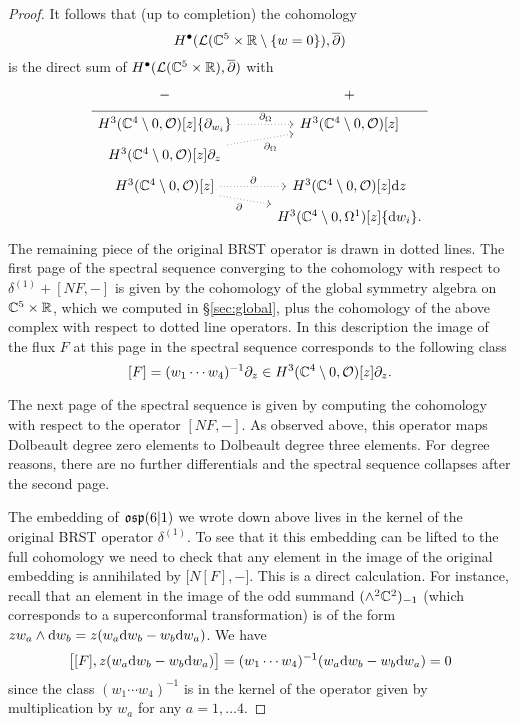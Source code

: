 \begin{proof}
It follows that (up to completion) the cohomology 
\[
H^\bullet(\mathcal L(\mathbb C^5 \times \mathbb R \setminus \{w=0\}) , \overline{\partial})
\]
is the direct sum of $H^\bullet(\mathcal L(\mathbb C^5 \times \mathbb R), \overline{\partial})$ with 
\begin{equation}
  \label{eqn:ads4ss2} 
  \begin{tikzcd}[row sep = 1 ex]
    - & + \\ \hline
H^3(\CC^4\setminus 0, \cO)[z] \{\partial_{w_i}\}  \ar[r, dotted, "\div"] & H^3(\CC^4 \setminus 0, \cO) [z] \\
H^3(\CC^4\setminus 0, \cO) [z] \partial_z \ar[ur, dotted, "\div"'] \\
H^3(\CC^4\setminus 0, \cO) [z] \ar[r, dotted, "\del"] \ar[dr, dotted, "\del"'] & H^3(\CC^4\setminus 0, \cO)[z] \d z \\ & H^3(\CC^4\setminus 0, \Omega^1)[z] \{\d w_i\} .
\end{tikzcd}
\end{equation}
The remaining piece of the original BRST operator is drawn in dotted lines. 
The first page of the spectral sequence converging to the cohomology with respect to $\delta^{(1)} + [N F, -]$ is given by the cohomology of the global symmetry algebra on $\mathbb C^5 \times \mathbb R$, which we computed in \S \ref{sec:global}, plus the cohomology of the above complex with respect to dotted line operators. 
In this description the image of the flux $F$ at this page in the spectral sequence corresponds to the following class 
\[
[F] = (w_1 \cdots w_4)^{-1} \partial_z \in H^3(\mathbb C^4\setminus 0, \mathcal O) [z] \partial_z .
\]

The next page of the spectral sequence is given by computing the cohomology with respect to the operator $[N F,-]$. 
As observed above, this operator maps Dolbeault degree zero elements to Dolbeault degree three elements. 
For degree reasons, there are no further differentials and the spectral sequence collapses after the second page. 

The embedding of $\mathfrak{osp}(6|1)$ we wrote down above lives in the kernel of the original BRST operator $\delta^{(1)}$. 
To see that it this embedding can be lifted to the full cohomology we need to check that any element in the image of the original embedding is annihilated by $\big[ N [F] , - \big]$. 
This is a direct calculation. 
For instance, recall that an element in the image of the odd summand $(\wedge^2 \mathbb C^2)_{-1}$ (which corresponds to a superconformal transformation) is of the form $z w_a \wedge {\rm d} w_b = z(w_a {\rm d} w_b - w_b {\rm d} w_a)$. 
We have
\[
\big[[F] , z(w_a {\rm d} w_b - w_b {\rm d} w_a) \big] = (w_1\cdots w_4)^{-1} (w_a {\rm d} w_b - w_b {\rm d} w_a) = 0
\]
since the class $(w_1\cdots w_4)^{-1}$ is in the kernel of the operator given by multiplication by $w_a$ for any $a = 1,\ldots 4$. 
\end{proof}

